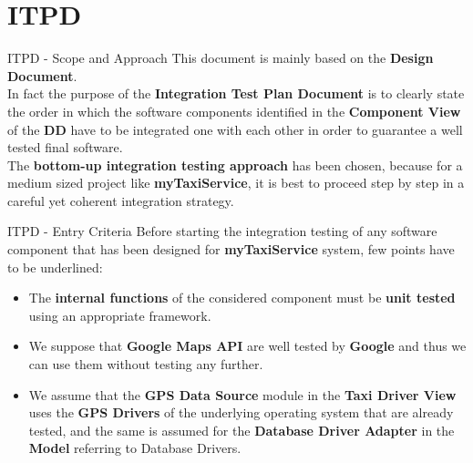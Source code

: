 \documentclass{../common/latex_classes/pdf_presentation}
\begin{document}
	\section{ITPD}
	\begin{frame}{ITPD - Scope and Approach}
		This document is mainly based on the \textbf{Design Document}. \\
		\medskip
		In fact the purpose of the \textbf{Integration Test Plan Document} is to clearly state the order in which the software components identified in the \textbf{Component View} of the \textbf{DD} have to be integrated one with each other in order to guarantee a well tested final software.\\
		\medskip
		The \textbf{bottom-up integration testing approach} has been chosen, because for a medium sized project like \textbf{myTaxiService}, it is best to proceed step by step in a careful yet coherent integration strategy.\\
	\end{frame}
	\begin{frame}{ITPD - Entry Criteria}
		Before starting the integration testing of any software component that has been designed for \textbf{myTaxiService} system, few points have to be underlined:
		\begin{itemize}
			 \item The \textbf{internal functions} of the considered component must be \textbf{unit tested} using an appropriate framework.
			 \item We suppose that \textbf{Google Maps API} are well tested by \textbf{Google} and thus we can use them without testing any
			 further.
			 \item We assume that the \textbf{GPS Data Source} module in the \textbf{Taxi Driver View} uses the \textbf{GPS Drivers} of the underlying operating system that are already tested, and the same is assumed for the \textbf{Database Driver Adapter} in the \textbf{Model} referring to Database Drivers.
		\end{itemize}
	\end{frame}
\end{document}

